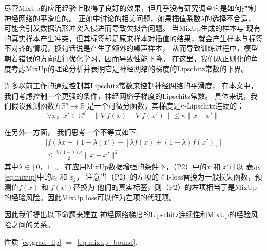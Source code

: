 \documentclass[promaster]{thesis-uestc}
\begin{document}
尽管MixUp的应用经验上取得了良好的效果，但几乎没有研究调查它是如何控制神经网络的平滑度的。 
正如\cite{Adamixup}中讨论的相关问题，如果插值系数$\lambda$的选择不合适，
可能会引发数据流形冲突入侵进而导致欠拟合问题。
当MixUp生成的样本与
现有的真实样本产生冲突，但其标签却是原来样本对插值的结果，就会产生样本与标签不对齐的情况，换句话说是产生了额外的噪声样本，
从而导致训练过程中，模型朝着错误的方向进行优化学习，因而导致性能下降。
在这里，我们从正则化的角度考虑MixUp的理论分析并表明它是神经网络的梯度的Lipschitz常数的下界。

许多以前工作的通过控制其Lipschitz常数来控制神经网络的平滑度\cite{cisse2017parseval}，
在本文中，我们考虑控制一个更强的条件，神经网络子梯度的Lipschitz常数。 
具体来说，我们假设预测函数$f:\mathbb{R}^d\to\mathbb R$
是一个可微分函数，其梯度是$\kappa$-Lipschitz连续的：
\begin{equation}\tag{P1}\label{eq:grad_lip}
    \forall{x， x' \in \mathbb{R}^d} \quad	\| \nabla f(x)-\nabla f(x')\| \le \kappa\| x - x'\|
\end{equation}

在另外一方面， 我们思考一个不等式如下: 
\begin{equation}\tag{P2}\label{eq:mixup_bound}
   \begin{split}
       |f(\lambda x + (1 - \lambda)x' ) - [\lambda f(x) + (1 - \lambda) f(x')]| \\
       \le \frac{\lambda (1-\lambda )\kappa}{2}\| x - x' \|^2
   \end{split}
\end{equation}
其中$\lambda\in [0，1]$。 在应用MixUp数据增强的条件下，（P2）中的$x$ 和 $x'$可以
表示\eqref{eq:mixup}中的$x_i$ 和 $x_j$。 注意当（P2）的左项的$\ell1$-loss替换为一般损失函数，预测值$f(x)$ 和 $f(x')$替换为
他们的真实标签，则（P2）的左项相当于是MixUp的经验风险。因此MixUp loss可以作为左项的代理项。

因此我们提出以下命题来建立
神经网络梯度的Lipschitz连续性和MixUp的经验风险之间的关系。

\begin{proposition}[神经网络梯度的Lipschitz连续性和MixUp的经验风险的联系]
	性质 \eqref{eq:grad_lip} $\Rightarrow$ \eqref{eq:mixup_bound}.
\end{proposition}
\end{document}
